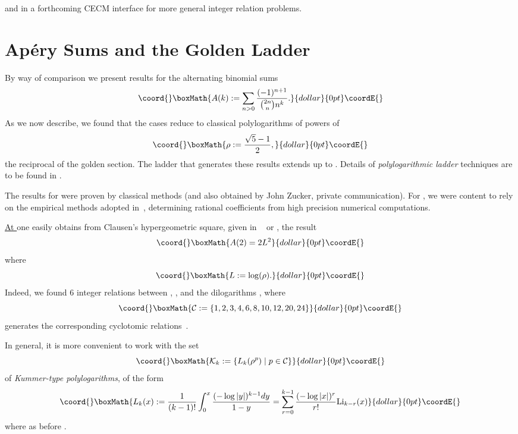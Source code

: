 \documentclass[a4paper,a4paper]{article}
\begin{document}
\vspace{\baselineskip}

\noindent
and in a forthcoming CECM interface for more general integer relation problems.

\section{
Ap\'ery Sums and
the Golden Ladder}

By way of comparison we present results for the alternating binomial
sums
$$\coord{}\boxMath{A(k):=\sum_{n>0}\frac{(-1)^{n+1}}{{2n\choose n}n^k}.}{dollar}{0pt}\coordE{}$$
As we now describe, we found that the cases \coordHE{}
reduce to classical polylogarithms  of  powers of
$$\coord{}\boxMath{\rho:=\frac{\sqrt5-1}2,}{dollar}{0pt}\coordE{}$$   the reciprocal
of the golden section.
The ladder that generates these results
extends up to \coordHE{}.
Details of {\em polylogarithmic ladder} techniques are to be found in
\cite{L2}.

 The results for \coordHE{} were proven by classical methods
(and also obtained by John Zucker, private communication). For \coordHE{},
we were content to rely on the empirical methods adopted in~\cite{L2},
determining rational coefficients from
high precision numerical computations.
\vspace{\baselineskip}

\underline{At \coordHE{}} one easily obtains from       Clausen's
 hypergeometric square, given in ~\cite{AS} or \cite{PA}, the  result
$$\coord{}\boxMath{A(2)=2L^2}{dollar}{0pt}\coordE{}$$ where $$\coord{}\boxMath{L:=\log(\rho).}{dollar}{0pt}\coordE{}$$ Indeed, we found 6 integer relations
between \coordHE{}, \coordHE{}, and the dilogarithms
\coordHE{}, where
$$\coord{}\boxMath{{\cal C}:=\{1,2,3,4,6,8,10,12,20,24\}}{dollar}{0pt}\coordE{}$$
generates the corresponding  cyclotomic relations~\cite{L2}.

In general, it is more convenient to work with the set
$$\coord{}\boxMath{{\cal K}_k:=\{L_k(\rho^p)\mid p\in{\cal C}\}}{dollar}{0pt}\coordE{}$$
of {\em Kummer-type polylogarithms}, of the form
$$\coord{}\boxMath{L_k(x):=\frac{1}{(k-1)!}\int_0^x\frac{(-\log|y|)^{k-1}dy}{1-y}
=\sum_{r=0}^{k-1}\frac{(-\log|x|)^r}{r!}{\rm Li}_{k-r}(x)}{dollar}{0pt}\coordE{}$$
where as before \coordHE{}.
\end{document}
